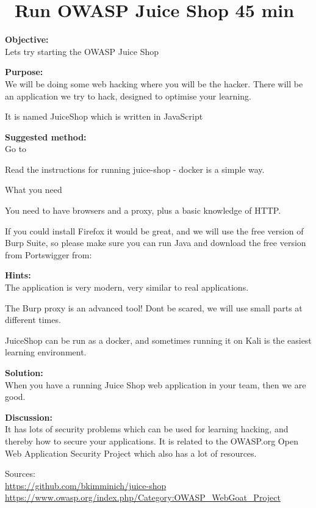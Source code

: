 \documentclass[a4paper,11pt,notitlepage]{report}
\begin{document}
\chapter{\faExclamationTriangle\ Run OWASP Juice Shop 45 min}
\label{ex:sw-startjuice}


{\bf Objective:}\\
Lets try starting the OWASP Juice Shop

{\bf Purpose:}\\
We will be doing some web hacking where you will be the hacker. There
will be an application we try to hack, designed to
optimise your learning.

It is named JuiceShop which is written in JavaScript

{\bf Suggested method:}\\
Go to 

Read the instructions for running juice-shop - docker is a simple way.

What you need

You need to have browsers and a proxy, plus a basic knowledge of HTTP.

If you could install Firefox it would be great, and we will use the
free version of Burp Suite, so please make sure you can run Java and
download the free version from Portswigger from:



{\bf Hints:}\\
The application is very modern, very similar to real applications.

The Burp proxy is an advanced tool! Dont be scared, we will use small parts at different times.

JuiceShop can be run as a docker, and sometimes running it on Kali is the easiest learning environment.

{\bf Solution:}\\
When you have a running Juice Shop web application in your team, then we are good.

{\bf Discussion:}\\
It has lots of security problems which can be used for learning
hacking, and thereby how to secure your applications. It is  related
to the OWASP.org Open Web Application Security Project which also has a
lot of resources.

Sources:\\
\url{https://github.com/bkimminich/juice-shop}\\
\url{https://www.owasp.org/index.php/Category:OWASP_WebGoat_Project}
\end{document}

